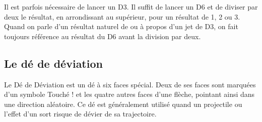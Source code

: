 Il est parfois nécessaire de lancer un D3. Il suffit de lancer un D6 et de diviser par deux le résultat, en arrondissant au supérieur, pour un résultat de 1, 2 ou 3. Quand on parle d'un résultat naturel de  ou  à propos d'un jet de D3, on fait toujours référence au résultat du D6 avant la division par deux.

\subsection{Le dé de déviation}

Le Dé de Déviation est un dé à six faces spécial. Deux de ses faces sont marquées d'un symbole \og Touché ! \fg{} et les quatre autres faces d'une flèche, pointant ainsi dans une direction aléatoire. Ce dé est généralement utilisé quand un projectile ou l'effet d'un sort risque de dévier de sa trajectoire.

